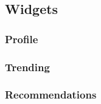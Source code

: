 \subsection{Widgets}

\subsubsection{Profile}

\subsubsection{Trending}

\subsubsection{Recommendations}
